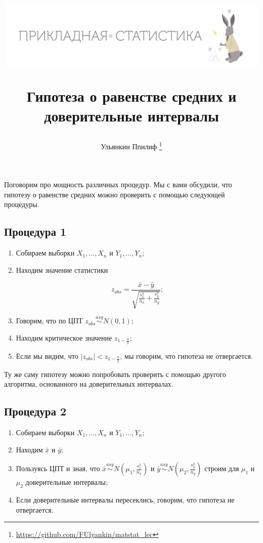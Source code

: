 \documentclass[12pt, a4paper, oneside]{article}
\title{
\begin{center} 
\includegraphics[width=0.99\textwidth]{logo.png}
\end{center}
Гипотеза о равенстве средних и доверительные интервалы}
\date{ } %
\author{Ульянкин Ппилиф \thanks{\url{https://github.com/FUlyankin/matstat_lec}}}
\begin{document}

\maketitle



Поговорим про мощность различных процедур. Мы с вами обсудили, что гипотезу о равенстве средних можно проверить с помощью следующей процедуры. 

\subsection*{Процедура 1}

\begin{enumerate}
\item  Собираем выборки $X_1, \ldots, X_n$ и $Y_1, \ldots, Y_n$;
\item  Находим значение статистики

$$
z_{obs} = \frac{\bar x - \bar y}{\sqrt{\frac{s_x^2}{n_x} + \frac{s_y^2}{n_y}}};
$$

\item Говорим, что по ЦПТ $z_{obs} \overset{asy}{\sim} N(0,1);$
\item Находим критическое значение $z_{1 - \frac{\alpha}{2}}$;
\item Если мы видим, что $|z_{obs}| <  z_{1 - \frac{\alpha}{2}}$, мы говорим, что гипотеза не отвергается. 
\end{enumerate}

Ту же саму гипотезу можно попробовать проверить с помощью другого алгоритма, основанного на доверительных интервалах.

\newpage

\subsection*{Процедура 2}

\begin{enumerate}
\item  Собираем выборки $X_1, \ldots, X_n$ и $Y_1, \ldots, Y_n$;
\item  Находим $\bar x$ и $\bar y$;
\item  Пользуясь ЦПТ и зная, что $\bar x \overset{asy}{\sim} N \left(\mu_1,\frac{s^2_x}{n_x} \right)$ и $\bar y \overset{asy}{\sim} N\left(\mu_2,\frac{s^2_y}{n_y}\right)$ строим для $\mu_1$ и $\mu_2$ доверительные интервалы;
\item Если доверительные интервалы пересеклись, говорим, что гипотеза не отвергается. 
\end{enumerate}
\end{document}

